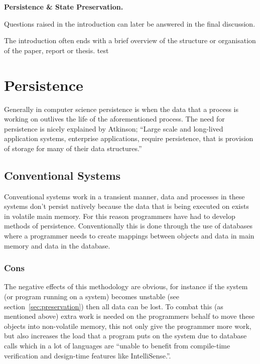 \documentclass[a4paper,12pt]{article}
\newenvironment{boxit}{\begin{lrbox}{\savepar}
        \begin{minipage}[b]{4.6in}}
        {\end{minipage}\end{lrbox}\fbox{\usebox{\savepar}}}
\begin{document}
\begin{center}
\begin{boxit}
\textbf{Persistence \& State Preservation.}
\end{boxit}
\end{center}

Questions raised in the introduction can later be answered in the final discussion.

The introduction often ends with a brief overview of the structure or organisation of
the paper, report or thesis.
test~\citep{ADearle}
%
\section{Persistence}\label{sec:persistence}
Generally in computer science persistence is when the data that a process is working on outlives the life of the aforementioned  process. 
The need for persistence is nicely explained by Atkinson;
``Large scale and long-lived application systems, enterprise applications, require persistence, that is provision of storage for many of their data structures.''~\citep{persistenceandjava}

\subsection{Conventional Systems}
Conventional systems work in a transient manner, data and processes in these systems don't persist natively because the data that is being executed on exists in volatile main memory. For this reason programmers have had to develop methods of persistence. Conventionally this is done through the use of databases where a programmer needs to create mappings between objects and data in main memory and data in the database.
\subsubsection{Cons}\label{sec:cons}
The negative effects of this methodology are obvious, for instance if the system (or program running on a system) becomes unstable (see section~\ref{sec:preservation}) then all data can be lost. To combat this (as mentioned above) extra work is needed on the programmers behalf to move these objects into non-volatile memory, this not only give the programmer more work, but also increases the load that a program puts on the system due to database calls which in a lot of languages are ``unable to benefit from compile-time verification and design-time features like IntelliSense.''\citep{XML}.
\end{document}
